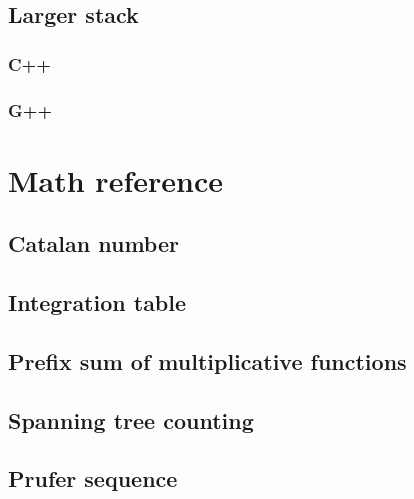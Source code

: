 \documentclass[UTF8,a4paper]{report}
\begin{document}
			\subsection{Larger stack}
				\subsubsection{C++}
					
				\subsubsection{G++}
					
		\section{Math reference}
			\subsection{Catalan number}
				
			\subsection{Integration table}
				
			\subsection{Prefix sum of multiplicative functions}
				
			\subsection{Spanning tree counting}
				
			\subsection{Prufer sequence}
				
\end{document}
